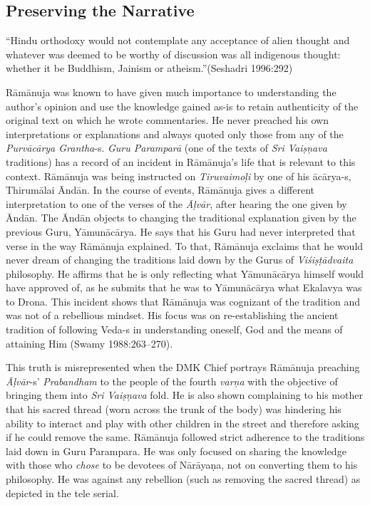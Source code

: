 \subsection*{Preserving the Narrative}

\begin{myquote}
“Hindu orthodoxy would not contemplate any acceptance of alien thought and whatever was deemed to be worthy of discussion was all indigenous thought: whether it be Buddhism, Jainism or atheism.”(Seshadri 1996:292)
\end{myquote}

Rāmānuja was known to have given much importance to understanding the author’s opinion and use the knowledge gained as-is to retain authenticity of the original text on which he wrote commentaries. He never preached his own interpretations or explanations and always quoted only those from any of the \textit{Purvācārya Grantha}-s. \textit{Guru Paramparā} (one of the texts of \textit{Sri Vaiṣņava} traditions) has a record of an incident in Rāmānuja’s life that is relevant to this context. Rāmānuja was being instructed on \textit{Tiruvaimoḷi }by one of his ācārya-s, Thirumālai Āndān. In the course of events, Rāmānuja gives a different interpretation to one of the verses of the \textit{Āḷvār}, after hearing the one given by Āndān. The Āndān objects to changing the traditional explanation given by the previous Guru, Yāmunācārya. He says that his Guru had never interpreted that verse in the way Rāmānuja explained. To that, Rāmānuja exclaims that he would never dream of changing the traditions laid down by the Gurus of \textit{Viśiṣṭādvaita} philosophy. He affirms that he is only reflecting what Yāmunācārya himself would have approved of, as he submits that he was to Yāmunācārya what Ekalavya was to Drona. This incident shows that Rāmānuja was cognizant of the tradition and was not of a rebellious mindset. His focus was on re-establishing the ancient tradition of following Veda-s in understanding oneself, God and the means of attaining Him (Swamy 1988:263–270).

This truth is misrepresented when the DMK Chief portrays Rāmānuja preaching \textit{Āḷvār}-s’ \textit{Prabandham} to the people of the fourth\textit{ varņa} with the objective of bringing them into \textit{Sri Vaiṣņava} fold. He is also shown complaining to his mother that his sacred thread (worn across the trunk of the body) was hindering his ability to interact and play with other children in the street and therefore asking if he could remove the same. Rāmānuja followed strict adherence to the traditions laid down in Guru Parampara. He was only focused on sharing the knowledge with those who \textit{chose} to be devotees of Nārāyaṇa, not on converting them to his philosophy. He was against any rebellion (such as removing the sacred thread) as depicted in the tele serial.

